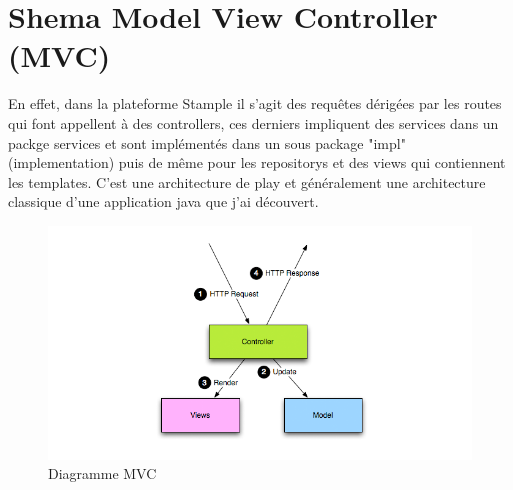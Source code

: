 \documentclass[12pt,oneside,a4paper]{article}
\begin{document}
\section{Shema Model View Controller (MVC)}
En effet, dans la plateforme Stample il s'agit des requêtes dérigées par les routes qui font appellent à des controllers, ces derniers impliquent des services dans un packge services et sont implémentés dans un sous package "impl" (implementation) puis de même pour les repositorys et des views qui contiennent les templates.
C'est une architecture de play et généralement une architecture classique d'une application java que j'ai découvert.
\begin{figure}[H]
        \centering
                \centering
                \includegraphics[width=\textwidth]{diagrams_mvc.png}
                \caption{Diagramme MVC}
                \label{fig:Diagramme MVC}
       
\end{figure}
\end{document}
